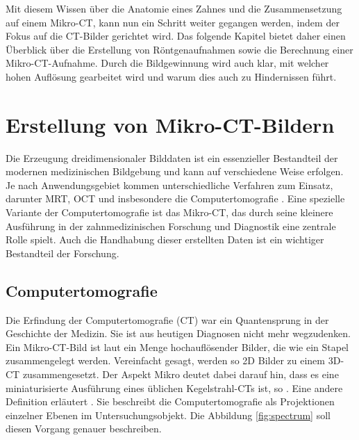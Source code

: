 Mit diesem Wissen über die Anatomie eines Zahnes und die Zusammensetzung auf einem
Mikro-\ac{CT}, kann nun ein Schritt weiter gegangen werden, indem der Fokus auf
die \ac{CT}-Bilder gerichtet wird. Das folgende Kapitel bietet daher einen
Überblick über die Erstellung von Röntgenaufnahmen sowie die Berechnung einer
Mikro-\ac{CT}-Aufnahme. Durch die Bildgewinnung wird auch klar, mit welcher hohen
Auflösung gearbeitet wird und warum dies auch zu Hindernissen führt.

\section{Erstellung von Mikro-CT-Bildern}
\label{sec:technologisch} Die Erzeugung dreidimensionaler Bilddaten ist ein essenzieller
Bestandteil der modernen medizinischen Bildgebung und kann auf verschiedene Weise
erfolgen. Je nach Anwendungsgebiet kommen unterschiedliche Verfahren zum Einsatz,
darunter \ac{MRT}, \ac{OCT} und insbesondere die Computertomografie \citep[vgl.][S.~14]{handels2000}.
Eine spezielle Variante der Computertomografie ist das Mikro-\ac{CT}, das durch
seine kleinere Ausführung in der zahnmedizinischen Forschung und Diagnostik eine
zentrale Rolle spielt. Auch die Handhabung dieser erstellten Daten ist ein wichtiger
Bestandteil der Forschung.

\subsection{Computertomografie}
\label{subsec:computertomografie} Die Erfindung der Computertomografie (\ac{CT})
war ein Quantensprung in der Geschichte der Medizin. Sie ist aus heutigen Diagnosen
nicht mehr wegzudenken. Ein Mikro-\ac{CT}-Bild ist laut \citet[S.~1]{baird2017}
ein Menge hochauflösender Bilder, die wie ein Stapel zusammengelegt werden.
Vereinfacht gesagt, werden so \ac{2D} Bilder zu einem \ac{3D}-\ac{CT}
zusammengesetzt. Der Aspekt Mikro deutet dabei darauf hin, dass es eine
miniaturisierte Ausführung eines üblichen Kegelstrahl-\ac{CT}s ist, so \citet[S.~340]{buzug2011}.
Eine andere Definition erläutert \citet[S.~49]{lehmann2013bildverarbeitung}. Sie
beschreibt die Computertomografie als Projektionen einzelner Ebenen im Untersuchungsobjekt.
Die Abbildung \ref{fig:spectrum} soll diesen Vorgang genauer beschreiben.

